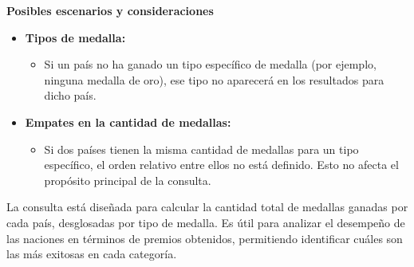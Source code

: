 \textbf{Posibles escenarios y consideraciones}

\begin{itemize}
   \item \textbf{Tipos de medalla:}
   \begin{itemize}
       \item Si un país no ha ganado un tipo específico de medalla (por ejemplo, ninguna medalla de oro), ese tipo no aparecerá en los resultados para dicho país.
   \end{itemize}

   \item \textbf{Empates en la cantidad de medallas:}
   \begin{itemize}
       \item Si dos países tienen la misma cantidad de medallas para un tipo específico, el orden relativo entre ellos no está definido. Esto no afecta el propósito principal de la consulta.
   \end{itemize}
\end{itemize}

La consulta está diseñada para calcular la cantidad total de medallas ganadas por cada país, desglosadas por tipo de medalla. Es útil para analizar el desempeño de las naciones en términos de premios obtenidos, permitiendo identificar cuáles son las más exitosas en cada categoría.
